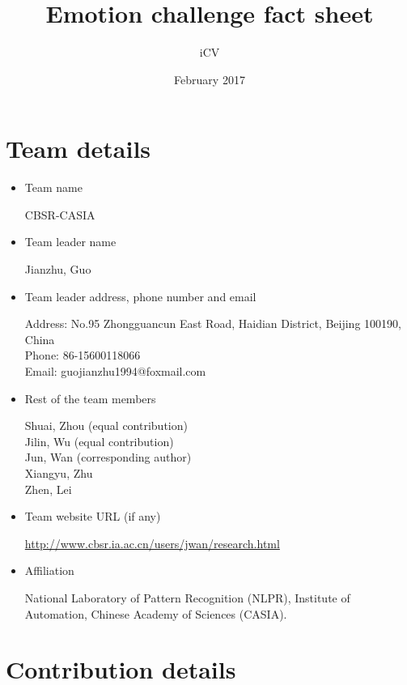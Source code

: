 \documentclass{article}
\title{Emotion challenge fact sheet}
\author{iCV}
\date{February 2017}
\begin{document}
\maketitle

\section{Team details}

\begin{itemize}
\item Team name

CBSR-CASIA

\item Team leader name

Jianzhu, Guo
\item Team leader address, phone number and email

Address: No.95 Zhongguancun East Road, Haidian District, Beijing 100190, China \\
Phone: 86-15600118066 \\
Email: guojianzhu1994@foxmail.com

\item Rest of the team members

Shuai, Zhou (equal contribution)\\
Jilin, Wu (equal contribution)\\
Jun, Wan (corresponding author) \\
Xiangyu, Zhu \\
Zhen, Lei 
\item Team website URL (if any)

\url{http://www.cbsr.ia.ac.cn/users/jwan/research.html}
\item Affiliation

National Laboratory of Pattern Recognition (NLPR), Institute of Automation, Chinese Academy of Sciences (CASIA).
\end{itemize}

\section{Contribution details}
\end{document}
